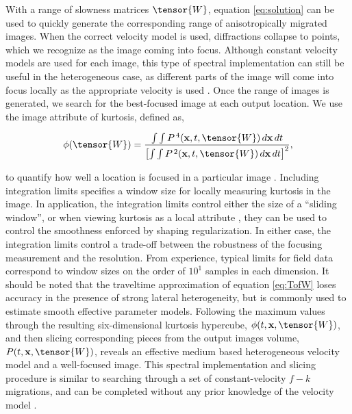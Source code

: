 With a range of slowness matrices $\tensor{W}$, equation \ref{eq:solution} can be used to quickly generate the corresponding range of anisotropically migrated images.  
When the correct velocity model is used, diffractions collapse to points, which we recognize as the image coming into focus.  
Although constant velocity models are used for each image, this type of spectral implementation can still be useful in the heterogeneous case, as different parts of the image will come into focus locally as the appropriate velocity is used \cite[]{GEO49-11-18691880, SEG-1984-S1.8}.  
Once the range of images is generated, we search for the best-focused image at each output location. We use the image attribute of kurtosis, defined as,

\begin{equation}
\label{eq:kurtosis}
\phi (\tensor{W})=\frac{\int \int P^{\,4}(\mathbf{x},t,\tensor{W})\,d\mathbf{x}\,dt}{\left[\int \int P^{\,2}(\mathbf{x},t,\tensor{W})\,d\mathbf{x}\,dt\right]^2},
\end{equation}

\noindent to quantify how well a location is focused in a particular image \cite[]{wiggins78, fomel_landa_taner07}. 
Including integration limits specifies a window size for locally measuring kurtosis in the image.  
In application, the integration limits control either the size of a ``sliding window'', or when viewing kurtosis as a local attribute \cite[]{fomel07b}, they can be used to control the smoothness enforced by shaping regularization.
In either case, the integration limits control a trade-off between the robustness of the focusing measurement and the resolution.
From experience, typical limits for field data correspond to window sizes on the order of $10^1$ samples in each dimension.
It should be noted that the traveltime approximation of equation \ref{eq:TofW} loses accuracy in the presence of strong lateral heterogeneity, but is commonly used to estimate smooth effective parameter models.
Following the maximum values through the resulting six-dimensional kurtosis hypercube, $\phi (t,\mathbf{x},\tensor{W})$,  and then slicing corresponding pieces from the output images volume, $P(t,\mathbf{x},\tensor{W})$, reveals an effective medium based heterogeneous velocity model and a well-focused image. 
This spectral implementation and slicing procedure is similar to searching through a set of constant-velocity $f-k$ migrations, and can be completed without any prior knowledge of the velocity model \cite[]{SEG-1984-S1.8, GEO57-01-00510059}.  
  



